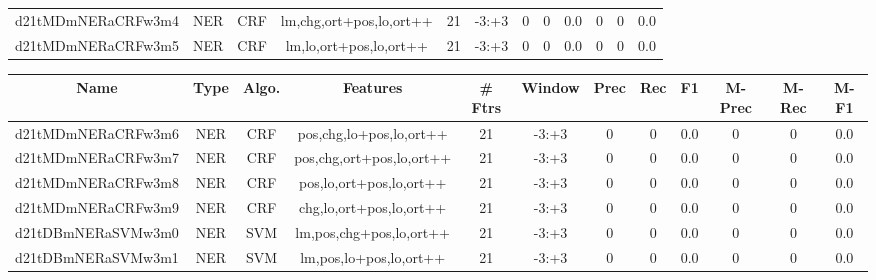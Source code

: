\documentclass[a4paper]{article}
\begin{document}
\begin{landscape}
\begin{center}
\begin{tabular}{ |c|c|c|c|c|c|c|c|c|c|c|c|}
 
 	
 	\small{ d21tMDmNERaCRFw3m4 } & \small{ NER} & \small{  CRF }  & lm,chg,ort+pos,lo,ort++  &  21 &  \small{  -3:+3 }  &  0 & 0 & 0.0  &  0 & 0 & 0.0 \\
 	

 
 	
 	\small{ d21tMDmNERaCRFw3m5 } & \small{ NER} & \small{  CRF }  & lm,lo,ort+pos,lo,ort++  &  21 &  \small{  -3:+3 }  &  0 & 0 & 0.0  &  0 & 0 & 0.0 \\
 	
 \hline
\end{tabular}
\end{center}




\begin{center}
\begin{tabular}{ |c|c|c|c|c|c|c|c|c|c|c|c|} 
 \hline
 	Name & Type & Algo. & Features & \# Ftrs & Window & Prec & Rec & F1 & M-Prec & M-Rec & M-F1\\
 \hline

 	

 
 	
 	\small{ d21tMDmNERaCRFw3m6 } & \small{ NER} & \small{  CRF }  & pos,chg,lo+pos,lo,ort++  &  21 &  \small{  -3:+3 }  &  0 & 0 & 0.0  &  0 & 0 & 0.0 \\
 	

 
 	
 	\small{ d21tMDmNERaCRFw3m7 } & \small{ NER} & \small{  CRF }  & pos,chg,ort+pos,lo,ort++  &  21 &  \small{  -3:+3 }  &  0 & 0 & 0.0  &  0 & 0 & 0.0 \\
 	

 
 	
 	\small{ d21tMDmNERaCRFw3m8 } & \small{ NER} & \small{  CRF }  & pos,lo,ort+pos,lo,ort++  &  21 &  \small{  -3:+3 }  &  0 & 0 & 0.0  &  0 & 0 & 0.0 \\
 	

 
 	
 	\small{ d21tMDmNERaCRFw3m9 } & \small{ NER} & \small{  CRF }  & chg,lo,ort+pos,lo,ort++  &  21 &  \small{  -3:+3 }  &  0 & 0 & 0.0  &  0 & 0 & 0.0 \\
 	

 
 	
 	\small{ d21tDBmNERaSVMw3m0 } & \small{ NER} & \small{  SVM }  & lm,pos,chg+pos,lo,ort++  &  21 &  \small{  -3:+3 }  &  0 & 0 & 0.0  &  0 & 0 & 0.0 \\
 	

 
 	
 	\small{ d21tDBmNERaSVMw3m1 } & \small{ NER} & \small{  SVM }  & lm,pos,lo+pos,lo,ort++  &  21 &  \small{  -3:+3 }  &  0 & 0 & 0.0  &  0 & 0 & 0.0 \\
 	


\end{tabular}
\end{center}
\end{landscape}
\end{document}
